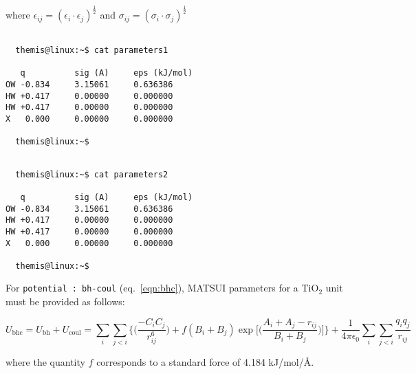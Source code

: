 \documentclass{achemso}
\begin{document}
where $\epsilon_{ij} = ( \epsilon_{i} \cdot \epsilon_{j})^\frac{1}{2}$ and
$\sigma_{ij} = ( \sigma_{i} \cdot \sigma_{j})^\frac{1}{2}$

\begin{center}
  \begin{minipage}{0.425\textwidth}
    \vskip0.25cm
    \begin{verbatim}

  themis@linux:~$ cat parameters1

   q          sig (A)     eps (kJ/mol)
OW -0.834     3.15061     0.636386
HW +0.417     0.00000     0.000000	 
HW +0.417     0.00000     0.000000	 
X   0.000     0.00000     0.000000

  themis@linux:~$

    \end{verbatim}
  \end{minipage}%
%
  \hskip0.5cm
%
  \begin{minipage}{0.425\textwidth}
    \vskip0.25cm
    \begin{verbatim}

  themis@linux:~$ cat parameters2

   q          sig (A)     eps (kJ/mol)
OW -0.834     3.15061     0.636386
HW +0.417     0.00000     0.000000	 
HW +0.417     0.00000     0.000000	 
X   0.000     0.00000     0.000000

  themis@linux:~$

    \end{verbatim}
  \end{minipage}%
\end{center}

  For \texttt{potential : bh-coul} (eq.~\ref{eqn:bhc}), MATSUI parameters 
for a TiO$_{2}$ unit must be provided as follows:

\begin{equation}
  \label{eqn:bhc}
  U_{\textrm{bhc}} = U_{\textrm{bh}} + U_{\textrm{coul}} = 
  \sum\limits_{i}
  \sum\limits_{j<i}\bigg\{\bigg(\frac{-C_{i}C_{j}}{r_{ij}^{6}}\bigg)
  + f(B_{i}+B_{j})
\exp\bigg[\bigg(\frac{A_{i}+A_{j}-r_{ij}}{B_{i}+B_{j}}\bigg)\bigg]\bigg\}
	+\frac{1}{4\pi\epsilon_{0}}\sum\limits_{i} \sum\limits_{j<i}\frac{q_{i}q_{j}}{r_{ij}}
\end{equation}

  where the quantity $f$ corresponds to a standard force of 4.184 kJ/mol/\AA. 
\end{document}
